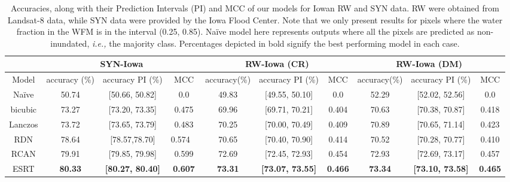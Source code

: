 \begin{table*}
\centering
\caption{\label{tab:IowaResults}Accuracies, along with their Prediction Intervals (PI) and \Acf{MCC} of our models for Iowan \Acf{RW} and \Acf{SYN} data. \Acf{RW} were obtained from Landsat-8 data, while \acf{SYN} data were provided by the Iowa Flood Center. Note that we only present results for pixels where the water fraction in the \ac{WFM} is in the interval (0.25, 0.85). Na\"ive model here represents outputs where all the pixels are predicted as non-inundated, \textit{i.e.,} the majority class. Percentages depicted in bold signify the best performing model in each case.}
\vspace*{0.25cm}
\begin{tabular}{@{}cccccccccc@{}}
\toprule
        & \multicolumn{3}{c}{SYN-Iowa}                       & \multicolumn{3}{c}{RW-Iowa (CR)}                  & \multicolumn{3}{c}{RW-Iowa (DM)}                  \\ \midrule
Model   & accuracy (\%)  & accuracy PI (\%) & MCC                        & accuracy(\%)  & accuracy PI (\%) & MCC                    & accuracy(\%)  & accuracy PI (\%) & MCC                 \\\midrule
Na\"ive & 50.74   & [50.66, 50.82]       & 0.0             & 49.83    & [49.55, 50.10]      & 0.0            & 52.29   & [52.02, 52.56]       & 0.0                  \\
bicubic & 73.27   & [73.20, 73.35]       & 0.475             & 69.96    & [69.71, 70.21]      & 0.404            & 70.63    & [70.38, 70.87]      & 0.418                  \\
Lanczos & 73.72   & [73.65, 73.79]       & 0.483               & 70.25    & [70.00, 70.49]      & 0.409                  & 70.89   & [70.65, 71.14]       & 0.423               \\
RDN     & 78.64   & [78.57,78.70]       & 0.574         \      & 70.65    & [70.40, 70.90]      & 0.414          & 70.52            & [70.28, 70.77]       & 0.410               \\
RCAN    & 79.91   & [79.85, 79.98]       & 0.599                  & 72.69    & [72.45, 72.93]      & 0.454                  & 72.93    & [72.69, 73.17]      & 0.457             \\
ESRT    & \textbf{80.33} & \textbf{[80.27, 80.40]} & \textbf{0.607}  & \textbf{73.31} & \textbf{[73.07, 73.55]} & \textbf{0.466} & \textbf{73.34} & \textbf{[73.10, 73.58]} & \textbf{0.465}  \\ \bottomrule
\end{tabular}
\end{table*}


